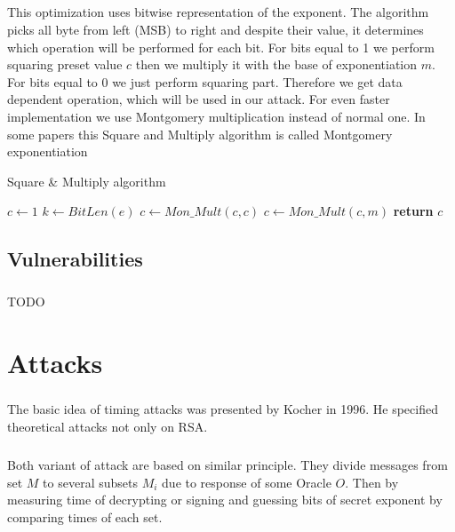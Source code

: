 \documentclass[thesis=B,english]{FITthesis}[2012/10/20]
\begin{document}
\paragraph*{}
{This optimization uses bitwise representation of the exponent. The algorithm picks all byte from left (MSB) to right and despite their value, 
it determines which operation will be performed for each bit. For bits equal to 1 we perform squaring preset value \(c\) then we multiply it with the base of exponentiation \(m\). 
For bits equal to 0 we just perform squaring part. Therefore we get data dependent operation, which will be used in our attack. For even faster implementation we use Montgomery
multiplication instead of normal one. In some papers this Square and Multiply algorithm is called Montgomery exponentiation}



\begin{algorithm}[H]
\caption{Square \& Multiply algorithm}
\begin{algorithmic}[1]
 \State $c\gets 1$
 \State $k\gets BitLen(e)$
  \State $c \gets Mon\_Mult(c,c)$
   \State $c \gets Mon\_Mult(c,m)$
  \EndIf
 \EndFor
\State \textbf{return} $c$
\EndFunction
 
\end{algorithmic}
\end{algorithm}

\section{Vulnerabilities}
\paragraph*{}
{TODO}


\chapter{Attacks}
\paragraph*{}{
The basic idea of timing attacks was presented by Kocher in 1996. He specified theoretical attacks not only on RSA.
}

\paragraph*{}{
Both variant of attack are based on similar principle. They divide messages from set \(M\) to several subsets \(M_i\) due to response of some Oracle \(O\). Then by measuring time of decrypting or signing and 
guessing bits of secret exponent by comparing times of each set.
}
\end{document}
